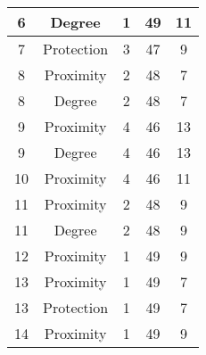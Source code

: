 \documentclass[results.tex]{subfiles}
\begin{document}
\begin{center}
\begin{tabular}{| c || c | c | c | c |}
            \hline
            6                       & Degree                       & 1                      & 49                      & 11                   \\
            \hline
            7                       & Protection                   & 3                      & 47                      & 9                    \\
            \hline
            8                       & Proximity                    & 2                      & 48                      & 7                    \\
            \hline
            8                       & Degree                       & 2                      & 48                      & 7                    \\
            \hline
            9                       & Proximity                    & 4                      & 46                      & 13                   \\
            \hline
            9                       & Degree                       & 4                      & 46                      & 13                   \\
            \hline
            10                      & Proximity                    & 4                      & 46                      & 11                   \\
            \hline
            11                      & Proximity                    & 2                      & 48                      & 9                    \\
            \hline
            11                      & Degree                       & 2                      & 48                      & 9                    \\
            \hline
            12                      & Proximity                    & 1                      & 49                      & 9                    \\
            \hline
            13                      & Proximity                    & 1                      & 49                      & 7                    \\
            \hline
            13                      & Protection                   & 1                      & 49                      & 7                    \\
            \hline
            14                      & Proximity                    & 1                      & 49                      & 9                    \\

\end{tabular}
\end{center}
\end{document}
